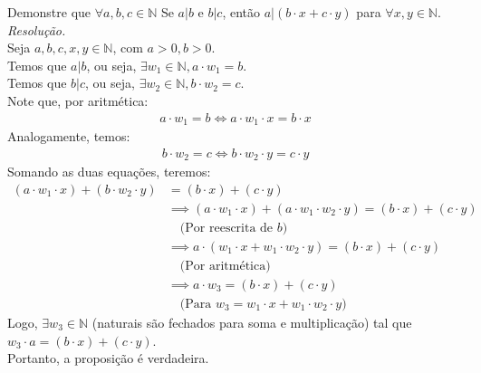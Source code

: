 Demonstre que $\forall a, b, c \in \mathbb{N}$ Se $a | b$ e $b | c$, então $a | (b \cdot x + c \cdot y)$ para $\forall x, y \in \mathbb{N}$. \\
\emph{Resolução.} \\
Seja $a, b, c, x, y \in \mathbb{N}$, com $a > 0, b > 0$. \\
Temos que $a | b$, ou seja, $\exists w_1 \in \mathbb{N}, a \cdot w_1 = b$. \\
Temos que $b | c$, ou seja, $\exists w_2 \in \mathbb{N}, b \cdot w_2 = c$. \\
Note que, por aritmética:
\begin{align*}
    a \cdot w_1 = b \iff a \cdot w_1 \cdot x = b \cdot x
\end{align*}
Analogamente, temos:
\begin{align*}
    b \cdot w_2 = c \iff b \cdot w_2 \cdot y = c \cdot y
\end{align*}
Somando as duas equações, teremos:
\begin{align*}
    (a \cdot w_1 \cdot x) + (b \cdot w_2 \cdot y) & = (b \cdot x) + (c \cdot y)         \\ &\implies
    (a \cdot w_1 \cdot x) + (a \cdot w_1 \cdot w_2 \cdot y) = (b \cdot x) + (c \cdot y) \\ &\quad \text{(Por reescrita de $b$)}\\ &\implies
    a \cdot (w_1 \cdot x + w_1 \cdot w_2 \cdot y) = (b \cdot x) + (c \cdot y)           \\ &\quad \text{(Por aritmética)} \\ &\implies
    a \cdot w_3 = (b \cdot x) + (c \cdot y)                                             \\ &\quad \text{(Para $w_3 = w_1 \cdot x + w_1 \cdot w_2 \cdot y$)}
\end{align*}
Logo, $\exists w_3 \in \mathbb{N}$ (naturais são fechados para soma e multiplicação) tal que $w_3 \cdot a = (b \cdot x) + (c \cdot y)$. \\
Portanto, a proposição é verdadeira.
